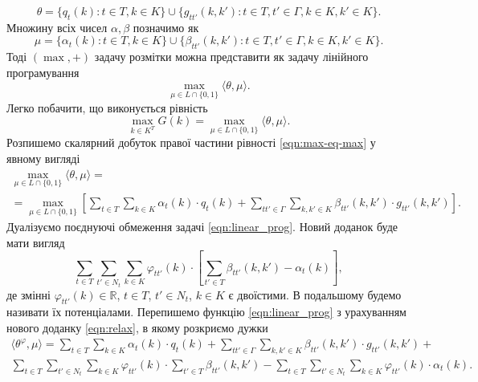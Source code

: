 \begin{equation*}
  \theta = \{q_t(k):t\in T, k\in K\}\cup\{g_{tt'}(k,k'):t\in T, t'\in\Gamma, k\in K, k'\in K\}.
\end{equation*}
Множину всіх чисел $\alpha, \beta$ позначимо як
\begin{equation*}
  \mu = \{\alpha_t(k):t\in T, k\in K\}\cup\{\beta_{tt'}(k,k'):t\in T, t'\in\Gamma, k\in K, k'\in K\}.
\end{equation*}
Тоді $(\max,+)$ задачу розмітки можна представити як задачу лінійного програмування
\begin{equation*}
  \max\limits_{\mu\in L\cap \{0,1\}}\langle\theta,\mu\rangle.
\end{equation*}
Легко побачити, що виконується рівність
\begin{equation*}
  \label{eqn:max-eq-max}
  \max_{k\in K^T} G(k) = \max\limits_{\mu\in L\cap \{0,1\}}\langle\theta,\mu\rangle.
\end{equation*}
Розпишемо скалярний добуток правої частини рівності \eqref{eqn:max-eq-max} у явному вигляді
\begin{equation}
  \label{eqn:linear_prog}
  \begin{gathered}
  \max\limits_{\mu\in L\cap \{0,1\}}\langle\theta,\mu\rangle = \\
  =
  \max\limits_{\mu\in L\cap \{0,1\}} \left[ \sum\limits_{t\in T}\sum\limits_{k\in K} \alpha_t(k)\cdot q_t(k) +
  \sum\limits_{tt'\in \Gamma}\sum\limits_{k,k'\in K} \beta_{tt'}(k,k')\cdot g_{tt'}(k,k') \right].
  \end{gathered}
\end{equation}
Дуалізуємо поєднуючі обмеження задачі \eqref{eqn:linear_prog}. Новий доданок буде
мати вигляд
\begin{equation}
  \label{eqn:relax}
  \sum\limits_{t\in T}\sum\limits_{t'\in N_t}\sum\limits_{k\in K} \varphi_{tt'}(k)\cdot \left[ \sum\limits_{t'\in T}\beta_{tt'}(k,k')-\alpha_t(k) \right],
\end{equation}
де змінні $\varphi_{tt'}(k)\in \mathbb{R}$, $t\in T$, $t'\in N_t$, $k\in K$ є двоїстими. В подальшому будемо
називати їх потенціалами.
Перепишемо функцію \eqref{eqn:linear_prog} з урахуванням нового доданку \eqref{eqn:relax}, в якому
розкриємо дужки
\begin{gather*}
  \langle\theta^{\varphi},\mu\rangle = \sum\limits_{t\in T}\sum\limits_{k\in K} \alpha_t(k)\cdot q_t(k)+
  \sum\limits_{tt'\in \Gamma}\sum\limits_{k,k'\in K} \beta_{tt'}(k,k')\cdot g_{tt'}(k,k')+\\
  \sum\limits_{t\in T}\sum\limits_{t'\in N_t}\sum\limits_{k\in K} \varphi_{tt'}(k)\cdot
  \sum\limits_{t'\in T}\beta_{tt'}(k,k') - \sum\limits_{t\in T}\sum\limits_{t'\in N_t}\sum\limits_{k\in K} \varphi_{tt'}(k)\cdot \alpha_t(k).
\end{gather*}
